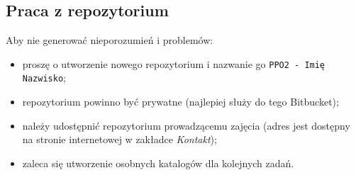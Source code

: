 \documentclass{article}
\begin{document}
	\subsection{Praca z repozytorium}
	Aby nie generować nieporozumień i problemów:
	\begin{itemize}
		\item proszę o utworzenie nowego repozytorium i  nazwanie go \texttt{PPO2 - Imię Nazwisko};
		\item repozytorium powinno być prywatne (najlepiej służy do tego Bitbucket);
		\item należy udostępnić repozytorium prowadzącemu zajęcia (adres jest dostępny na stronie internetowej w zakładce \emph{Kontakt});
		\item zaleca się utworzenie osobnych katalogów dla kolejnych zadań.
	\end{itemize}
\end{document}
